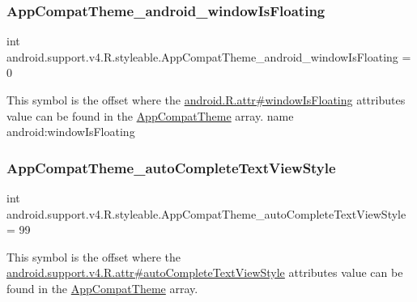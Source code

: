 \subsubsection{\texorpdfstring{App\+Compat\+Theme\+\_\+android\+\_\+window\+Is\+Floating}{AppCompatTheme\_android\_windowIsFloating}}
{\footnotesize\ttfamily int android.\+support.\+v4.\+R.\+styleable.\+App\+Compat\+Theme\+\_\+android\+\_\+window\+Is\+Floating = 0\hspace{0.3cm}{\ttfamily [static]}}

This symbol is the offset where the \hyperlink{}{android.\+R.\+attr\#window\+Is\+Floating} attribute\textquotesingle{}s value can be found in the \hyperlink{classandroid_1_1support_1_1v4_1_1R_1_1styleable_ac07ebbe62ed977f6dcaadc6397840ace}{App\+Compat\+Theme} array.  name android\+:window\+Is\+Floating \mbox{\label{classandroid_1_1support_1_1v4_1_1R_1_1styleable_a7aa1a2971f395765ecd403cc29ee5c95}} 
\subsubsection{\texorpdfstring{App\+Compat\+Theme\+\_\+auto\+Complete\+Text\+View\+Style}{AppCompatTheme\_autoCompleteTextViewStyle}}
{\footnotesize\ttfamily int android.\+support.\+v4.\+R.\+styleable.\+App\+Compat\+Theme\+\_\+auto\+Complete\+Text\+View\+Style = 99\hspace{0.3cm}{\ttfamily [static]}}

This symbol is the offset where the \hyperlink{classandroid_1_1support_1_1v4_1_1R_1_1attr_a1431731a557fac44d41907daa49e4b8f}{android.\+support.\+v4.\+R.\+attr\#auto\+Complete\+Text\+View\+Style} attribute\textquotesingle{}s value can be found in the \hyperlink{classandroid_1_1support_1_1v4_1_1R_1_1styleable_ac07ebbe62ed977f6dcaadc6397840ace}{App\+Compat\+Theme} array.

